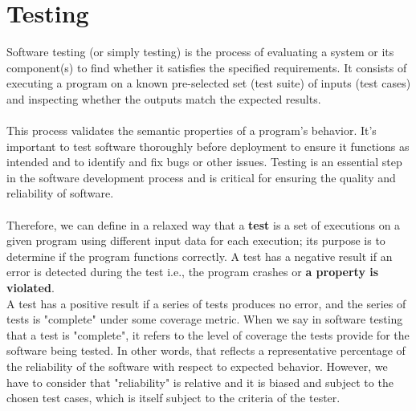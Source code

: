 \documentclass{report}
\theoremstyle{definition}
\theoremstyle{definition}
\begin{document}
\section{Testing}

Software testing (or simply testing) is the process of evaluating a system or its component(s) to find whether it satisfies the specified requirements. It consists of executing a program on a known pre-selected set (test suite) of inputs (test cases) and inspecting whether the outputs match the expected results.\\\\
This process validates the semantic properties of a program's behavior. It's important to test software thoroughly before deployment to ensure it functions as intended and to identify and fix bugs or other issues. Testing is an essential step in the software development process and is critical for ensuring the quality and reliability of software.\\\\
Therefore, we can define in a relaxed way that a \textbf{test} is a set of executions on a given program using different input data for each execution; its purpose is to determine if the program functions correctly. A test has a negative result if an error is detected during the test i.e., the program crashes or \textbf{a property is violated}. \\

A test has a positive result if a series of tests produces no error, and the series of tests is "complete" under some coverage metric. When we say in software testing that a test is "complete", it refers to the level of coverage the tests provide for the software being tested. In other words, that reflects a representative percentage of the reliability of the software with respect to expected behavior. However, we have to consider that "reliability" is relative and it is biased and subject to the chosen test cases, which is itself subject to the criteria of the tester.\\
\end{document}
